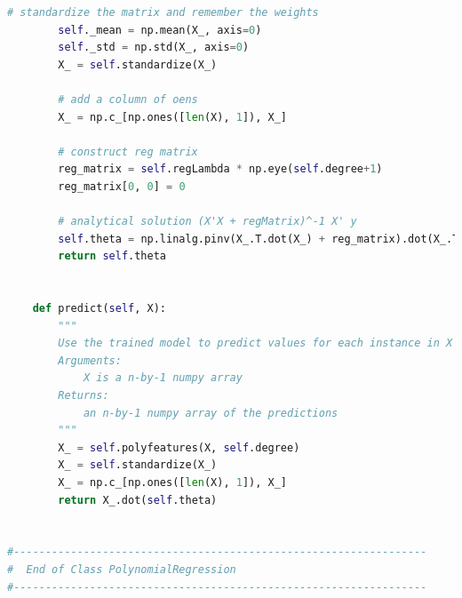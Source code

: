 \documentclass{article}
\newcommand{\1}{\mathbf{1}}
\begin{document}
\begin{lstlisting}[language=Python]
        # standardize the matrix and remember the weights
        self._mean = np.mean(X_, axis=0)
        self._std = np.std(X_, axis=0)
        X_ = self.standardize(X_)

        # add a column of oens
        X_ = np.c_[np.ones([len(X), 1]), X_]

        # construct reg matrix
        reg_matrix = self.regLambda * np.eye(self.degree+1)
        reg_matrix[0, 0] = 0

        # analytical solution (X'X + regMatrix)^-1 X' y
        self.theta = np.linalg.pinv(X_.T.dot(X_) + reg_matrix).dot(X_.T).dot(y)
        return self.theta


    def predict(self, X):
        """
        Use the trained model to predict values for each instance in X
        Arguments:
            X is a n-by-1 numpy array
        Returns:
            an n-by-1 numpy array of the predictions
        """
        X_ = self.polyfeatures(X, self.degree)
        X_ = self.standardize(X_)
        X_ = np.c_[np.ones([len(X), 1]), X_]        
        return X_.dot(self.theta)


#-----------------------------------------------------------------
#  End of Class PolynomialRegression
#-----------------------------------------------------------------
\end{lstlisting}





\newpage
\end{document}
